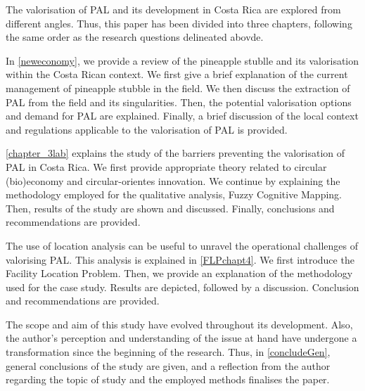 The valorisation of PAL and its development in Costa Rica are explored from different angles. Thus, this paper has been divided into three chapters, following the same order as the research questions delineated abovde.

In \cref{neweconomy}, we provide a review of the pineapple stublle and its valorisation within the Costa Rican context. We first give a brief explanation of the current management of pineapple stubble in the field. We then discuss the extraction of PAL from the field and its singularities. Then, the potential valorisation options and demand for PAL are explained. Finally, a brief discussion of the local context and regulations applicable to the valorisation of PAL is provided.

\cref{chapter_3lab} explains the study of the barriers preventing the valorisation of PAL in Costa Rica. We first provide appropriate theory related to circular (bio)economy and circular-orientes innovation. We continue by explaining the methodology employed for the qualitative analysis, Fuzzy Cognitive Mapping. Then, results of the study are shown and discussed. Finally, conclusions and recommendations are provided. 

The use of location analysis can be useful to unravel the operational challenges of valorising PAL. This analysis is explained in \cref{FLPchapt4}. We first introduce the Facility Location Problem. Then, we provide an explanation of the methodology used for the case study. Results are depicted, followed by a discussion. Conclusion and recommendations are provided. 

The scope and aim of this study have evolved throughout its development. Also, the author's perception and understanding of the issue at hand have undergone a transformation since the beginning of the research. Thus, in \cref{concludeGen}, general conclusions of the study are given, and a reflection from the author regarding the topic of study and the employed methods finalises the paper. 

